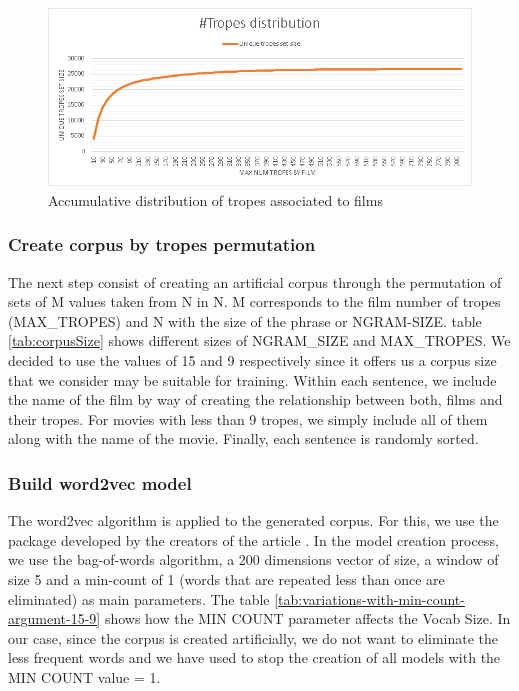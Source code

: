 \documentclass[letterpaper]{article}
\begin{document}
    \begin{figure}
\centering
\includegraphics[width=1\linewidth]{../images/tropes_distribution_chart.png}
\caption{Accumulative distribution of tropes associated to films}
\label{fig:tropesdistributionasociatedtofilms}
\end{figure}

\subsubsection{Create corpus by tropes permutation}
The next step consist of creating an artificial corpus through the permutation of sets of M values taken from N in N. M corresponds to the film number of tropes  (MAX\_TROPES) and N with the size of the phrase or NGRAM-SIZE. table \ref{tab:corpusSize} shows different sizes of NGRAM\_SIZE and MAX\_TROPES. We decided to use the values of 15 and 9 respectively since it offers us a corpus size that we consider may be suitable for training. Within each sentence, we include the name of the film by way of creating the relationship between both, films and their tropes. 
For movies with less than 9 tropes, we simply include all of them along with the name of the movie. Finally, each sentence is randomly sorted.

\subsubsection{Build word2vec model}

The word2vec algorithm is applied to the generated corpus. For this, we use the package \cite{git-hub-word2vec} developed by the creators of the article \cite{mikolov2013}. In the model creation process, we use the bag-of-words algorithm, a 200 dimensions vector of size, a window of size 5 and a min-count of 1 (words that are repeated less than once are eliminated) as main parameters. The table \ref{tab:variations-with-min-count-argument-15-9} shows how the MIN COUNT parameter affects the Vocab Size. In our case, since the corpus is created artificially, we do not want to eliminate the less frequent words and we have used to stop the creation of all models with the MIN COUNT value = 1.
	
\end{document}
